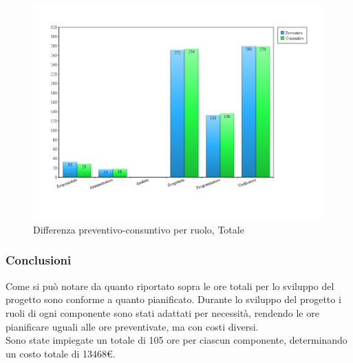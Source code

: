 \begin{figure}[H]
	\centering
	\includegraphics[scale=0.4]{immagini/Grafi/Totale_oreRuolo.png}
	\caption{Differenza preventivo-consuntivo per ruolo, Totale}
\end{figure}
\FloatBarrier

\subsubsection{Conclusioni}
Come si può notare da quanto riportato sopra le ore totali per lo sviluppo del progetto sono conforme a quanto pianificato. Durante lo sviluppo del progetto i ruoli di ogni componente sono stati adattati per necessità, rendendo le ore pianificare uguali alle ore preventivate, ma con costi diversi. \\
Sono state impiegate un totale di 105 ore per ciascun componente, determinando un costo totale di 13468€.